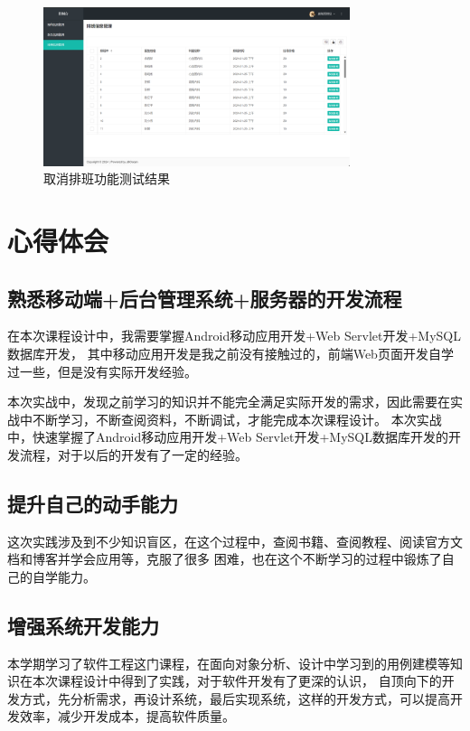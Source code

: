 \documentclass[UTF8,12pt]{article}
\begin{document}
\begin{figure}[htbp]
    \centering
    \includegraphics[width=0.8\textwidth]{imgs/40.png}
    \caption{取消排班功能测试结果}
\end{figure}

\newpage

\section{心得体会}

\subsection{熟悉移动端+后台管理系统+服务器的开发流程}
在本次课程设计中，我需要掌握Android移动应用开发+Web Servlet开发+MySQL数据库开发，
其中移动应用开发是我之前没有接触过的，前端Web页面开发自学过一些，但是没有实际开发经验。

本次实战中，发现之前学习的知识并不能完全满足实际开发的需求，因此需要在实战中不断学习，不断查阅资料，不断调试，才能完成本次课程设计。
本次实战中，快速掌握了Android移动应用开发+Web Servlet开发+MySQL数据库开发的开发流程，对于以后的开发有了一定的经验。

\subsection{提升自己的动手能力}
这次实践涉及到不少知识盲区，在这个过程中，查阅书籍、查阅教程、阅读官方文档和博客并学会应用等，克服了很多
困难，也在这个不断学习的过程中锻炼了自己的自学能力。

\subsection{增强系统开发能力}
本学期学习了软件工程这门课程，在面向对象分析、设计中学习到的用例建模等知识在本次课程设计中得到了实践，对于软件开发有了更深的认识，
自顶向下的开发方式，先分析需求，再设计系统，最后实现系统，这样的开发方式，可以提高开发效率，减少开发成本，提高软件质量。
\end{document}
